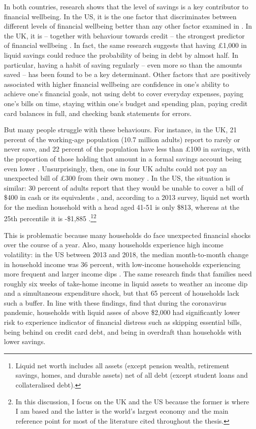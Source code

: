 In both countries, research shows that the level of savings is a key
contributor to financial wellbeing. In the US, it is the one factor that
discriminates between different levels of financial wellbeing better than any
other factor examined in \citep{cfpb2017financial}. In the UK, it is -- together
with behaviour towards credit -- the strongest predictor of financial wellbeing
\citep{mps2018building}. In fact, the same research suggests that having
\pounds1,000 in liquid savings could reduce the probability of being in debt by
almost half. In particular, having a habit of saving regularly -- even more so
than the amounts saved -- has been found to be a key determinant. Other
factors that are positively associated with higher financial wellbeing are
confidence in one's ability to achieve one's financial goals, not using debt to
cover everyday expenses, paying one's bills on time, staying within one's budget
and spending plan, paying credit card balances in full, and checking bank
statements for errors.

But many people struggle with these behaviours. For instance, in the UK, 21
percent of the working-age population (10.7 million adults) report to rarely or
never save, and 22 percent of the population have less than \pounds100 in
savings, with the proportion of those holding that amount in a formal savings account being even
lower \citep{mps2018building}. Unsurprisingly, then, one in four UK adults could
not pay an unexpected bill of \pounds300 from their own money
\citep{phillips2021supporting}. In the US, the situation is similar: 30 percent
of adults report that they would be unable to cover a bill of \$400 in cash or
its equivalents \citep{fed2022economic}, and, according to a 2013 survey,
liquid net worth for the median household with a head aged 41-51 is only \$813,
whereas at the 25th percentile it is -\$1,885
\citep{beshears2018behavioral}.\footnote{Liquid net worth includes all assets
    (except pension wealth, retirement savings, homes, and durable assets) net
of all debt (except student loans and collateralised debt).}\footnote{In this discussion, I focus on the UK and the US because the former is where I am based and the latter is the world's largest economy and the main reference point for most of the literature cited throughout the thesis.}

This is problematic because many households do face unexpected financial shocks
over the course of a year. Also, many households experience high income
volatility: in the US between 2013 and 2018, the median month-to-month change
in household income was 36 percent, with low-income households experiencing
more frequent and larger income dips \citep{jpmorgan2019weathering}. The same
research finds that families need roughly six weeks of take-home income
in liquid assets to weather an income dip and a simultaneous expenditure shock, but that 65
percent of households lack such a buffer. In line with these findings,
\citet{roll2020income} find that during the coronavirus pandemic, households
with liquid asses of above \$2,000 had significantly lower risk to experience indicator of financial distress such as skipping essential bills, being behind on
credit card debt, and being in overdraft than households with lower savings.

